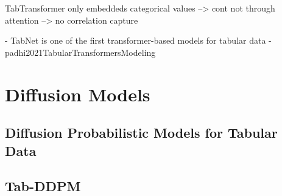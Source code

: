 TabTransformer only embeddeds categorical values --> cont not through attention --> no correlation capture \cite{somepalli2021SAINTImprovedNeural}

- TabNet is one of the first transformer-based models for tabular data \cite{borisov2022DeepNeuralNetworks}
- padhi2021TabularTransformersModeling


\section{Diffusion Models}
\label{ch:relatedWork-diffusionModels}


\subsection{Diffusion Probabilistic Models for Tabular Data}
\label{ch:preliminaries-generativeAlgorithms-diffusionProbabilisticModelsTabularData}


\subsection{Tab-DDPM}
\label{ch:relatedWork-diffusionModels-tabDDPM}



